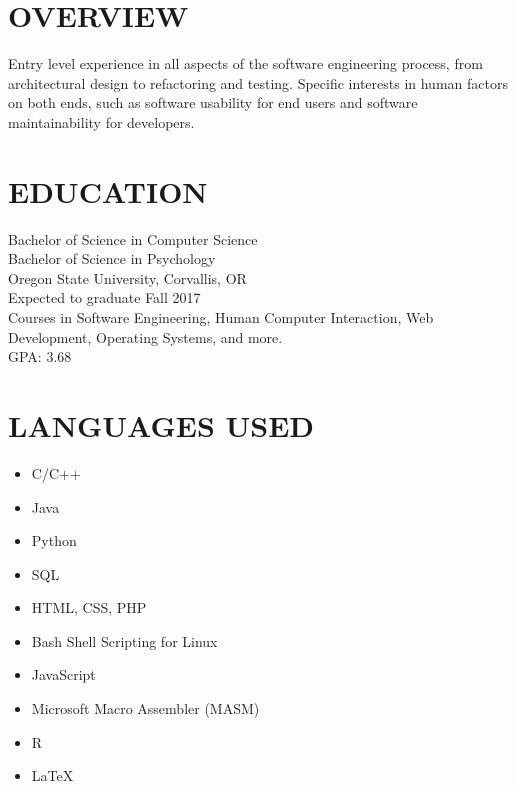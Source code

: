 \documentclass[line, margin]{res}
\begin{document}
\address{636 NW 10th St\\ Corvallis, OR 97330\\ (541) 740-6700}

\begin{resume}
\section{OVERVIEW}
Entry level experience in all aspects of the software engineering process, from architectural design to refactoring and testing. Specific interests in human factors on both ends, such as software usability for end users and software maintainability for developers.

\section{EDUCATION}
Bachelor of Science in Computer Science \\
Bachelor of Science in Psychology \\
Oregon State University, Corvallis, OR \\
Expected to graduate Fall 2017 \\
Courses in Software Engineering, Human Computer Interaction, Web Development, Operating Systems, and more. \\
GPA: 3.68

\section{LANGUAGES USED}
\begin{itemize}
\small
\item C/C++
\item Java
\item Python
\item SQL
\item HTML, CSS, PHP
\item Bash Shell Scripting for Linux
\item JavaScript
\item Microsoft Macro Assembler (MASM)
\item R
\item LaTeX
\end{itemize}


\end{resume}
\end{document}
